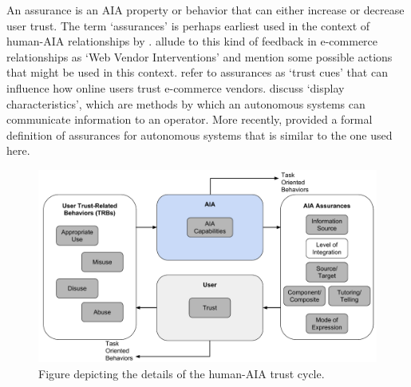 An assurance is an AIA property or behavior that can either increase or decrease user trust. The term `assurances' is perhaps earliest used in the context of human-AIA relationships by \citet{Sheridan1984-kx}. \citet{McKnight2001-fa} allude to this kind of feedback in e-commerce relationships as `Web Vendor Interventions' and mention some possible actions that might be used in this context. \citet{Corritore2003-gx} refer to assurances as `trust cues' that can influence how online users trust e-commerce vendors. \citet{Lee2004-pv} discuss `display characteristics', which are methods by which an autonomous systems can communicate information to an operator. More recently, \citet{Lillard2016-yg} provided a formal definition of assurances for autonomous systems that is similar to the one used here. 

\begin{figure}[t]%
    \centering
    \includegraphics[width=0.6\linewidth]{Figures/RefinedTrust_one_way.pdf}
    \caption{Figure depicting the details of the human-AIA trust cycle.}
    \label{fig:refined_trust}
\end{figure}

